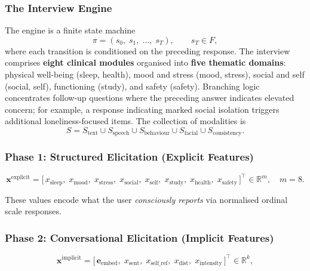 \documentclass[12pt]{article}
\begin{document}
\subsubsection{The Interview Engine}

The engine is a finite state machine
\begin{equation}
\pi = (s_0,\; s_1,\; \ldots,\; s_T), \qquad s_T \in F,
\end{equation}
where each transition is conditioned on the preceding response. The
interview comprises \textbf{eight clinical modules} organised into
\textbf{five thematic domains}: physical well-being (sleep, health),
mood and stress (mood, stress), social and self (social, self),
functioning (study), and safety (safety). Branching logic concentrates
follow-up questions where the preceding answer indicates elevated
concern; for example, a response indicating marked social isolation
triggers additional loneliness-focused items. The collection of
modalities is
\begin{equation}
S = S_{\text{text}} \cup S_{\text{speech}} \cup S_{\text{behaviour}}
    \cup S_{\text{facial}} \cup S_{\text{consistency}}.
\end{equation}

\subsubsection{Phase 1: Structured Elicitation (Explicit Features)}

\begin{equation}
\mathbf{x}^{\text{explicit}} = \bigl[\, x_{\text{sleep}},\; x_{\text{mood}},\;
x_{\text{stress}},\; x_{\text{social}},\; x_{\text{self}},\;
x_{\text{study}},\; x_{\text{health}},\; x_{\text{safety}} \,\bigr]^{\top}
\in \mathbb{R}^{m}, \quad m = 8.
\end{equation}

\noindent These values encode what the user \emph{consciously reports} via
normalised ordinal scale responses.

\subsubsection{Phase 2: Conversational Elicitation (Implicit Features)}

\begin{equation}
\mathbf{x}^{\text{implicit}} = \bigl[\, \mathbf{e}_{\text{embed}},\;
x_{\text{sent}},\; x_{\text{self\_ref}},\; x_{\text{dist}},\;
x_{\text{intensity}} \,\bigr]^{\top} \in \mathbb{R}^{k},
\end{equation}
\end{document}

